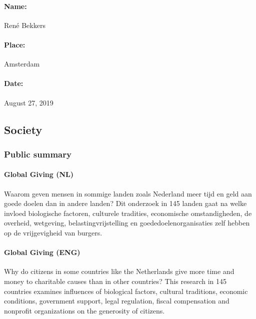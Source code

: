 \documentclass[twocolumn, serif, rga, numeric]{jote-article}
\begin{document}
\paragraph{Name:} Ren\'e Bekkers 

\paragraph{Place:} Amsterdam 

\paragraph{Date:} August 27, 2019 
 {}\subsection*{Society} 

 {}\subsubsection*{Public summary} 

\paragraph{Global Giving (NL)} 
Waarom geven mensen in sommige landen zoals Nederland meer tijd en geld aan goede doelen dan in andere landen? Dit onderzoek in 145 landen gaat na welke invloed biologische factoren, culturele tradities, economische omstandigheden, de overheid, wetgeving, belastingvrijstelling en goededoelenorganisaties zelf hebben op de vrijgevigheid van burgers.

\paragraph{Global Giving (ENG)} 
Why do citizens in some countries like the Netherlands give more time and money to charitable causes than in other countries? This research in 145 countries examines influences of biological factors, cultural traditions, economic conditions, government support, legal regulation, fiscal compensation and nonprofit organizations on the generosity of citizens.
\end{document}
